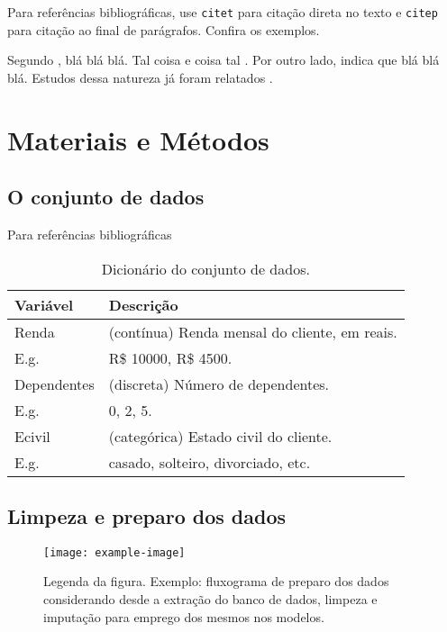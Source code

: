 \documentclass[9pt, a4paper, twocolumn]{article}
\begin{document}
Para referências bibliográficas, use \texttt{citet} para citação direta
no texto e \texttt{citep} para citação ao final de parágrafos. Confira os
exemplos.

Segundo \citet{wickham2016r}, blá blá blá. Tal coisa e coisa tal
\citep{bruce2019estatistica}. Por outro lado, \citet{grus2019data}
indica que blá blá blá. Estudos dessa natureza já foram relatados
\citep{bruce2019estatistica, fawcett2018data}.


\section{Materiais e Métodos}

\lipsum[6]

\subsection{O conjunto de dados}
Para referências bibliográficas
\lipsum[7]


\begin{table}[H]
  \caption{Dicionário do conjunto de dados.}
  \begin{tabular}{m{2.5cm} m{5cm}}
    \hline
    Variável & Descrição \\ \hline
    Renda & (contínua) Renda mensal do cliente, em reais. \\
    E.g. &  R\$ 10000, R\$ 4500.\\ \hline
    Dependentes & (discreta) Número de dependentes. \\
    E.g. & 0, 2, 5. \\ \hline
    Ecivil & (categórica) Estado civil do cliente. \\
    E.g. & casado, solteiro, divorciado, etc. \\ \hline
  \end{tabular}
\end{table}

\subsection{Limpeza e preparo dos dados}

\lipsum[8]

\begin{figure}[H]
  \centering
  \texttt{[image: example-image]}
  \caption{Legenda da figura. Exemplo: fluxograma de preparo dos dados
    considerando desde a extração do banco de dados, limpeza e imputação
    para emprego dos mesmos nos modelos.}
  \label{fig_01}
\end{figure}
\end{document}
